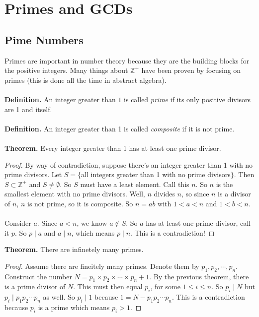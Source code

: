 \documentclass[class=article, crop=false]{standalone}
\def\integers{{\mathbb Z}}
\begin{document}
    
\section{Primes and GCDs}

\subsection{Pime Numbers}
Primes are important in number theory because they are the building blocks for the positive integers.
Many things about $\integers^+$ have been proven by focusing on primes (this is done all the time in abstract algebra).\\\\
\textbf{Definition.} An integer greater than $1$ is called \emph{prime} if its only positive divisors are 
1 and itself.\\\\
\textbf{Definition.} An integer greater than 1 is called \emph{composite} if it is not prime.\\\\
\textbf{Theorem.} Every integer greater than 1 has at least one prime divisor.
\begin{proof}
	By way of contradiction, suppose there's an integer greater than 1 with no prime divisors.
	Let $S=\{$all integers greater than 1 with no prime divisors$\}$.
	Then $S\subset\integers^+$ and $S\neq\emptyset$. So $S$ must have a least element. Call this $n$.
	So $n$ is the smallest element with no prime divisors. Well, $n$ divides $n$, so since $n$ is a divisor
	of $n$, $n$ is not prime, so it is composite. So $n=ab$ with $1<a<n$ and $1<b<n$.\\\\
	Consider $a$. Since $a<n$, we know $a\notin S$. So $a$ has at least one prime divisor, call it $p$.
	So $p\mid a$ and $a\mid n$, which means $p\mid n$. This is a contradiction!
\end{proof}
\noindent\textbf{Theorem.} There are infinetely many primes.
\begin{proof}
	Assume there are fineitely many primes. Denote them by $p_1, p_2, \cdots, p_n$. Construct the number
	$N=p_1\times p_2\times \cdots \times p_n + 1$. By the previous theorem, there is a prime divisor of $N$.
	This must then equal $p_i$, for some $1\leq i\leq n$. So $p_i \mid N$ but $p_i\mid p_1 p_2\cdots p_n$ as well.
	So $p_i\mid 1$ because $1=N-p_1p_2\cdots p_n$. This is a contradiction because $p_i$ is a prime which means $p_i >1$.
\end{proof}
\end{document}
